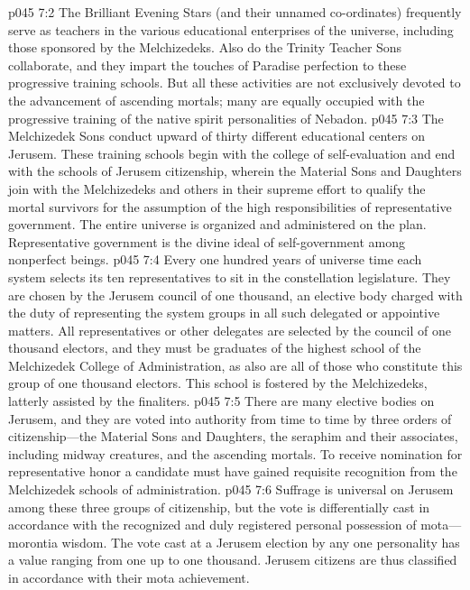 \vs p045 7:2 The Brilliant Evening Stars (and their unnamed co\hyp{}ordinates) frequently serve as teachers in the various educational enterprises of the universe, including those sponsored by the Melchizedeks. Also do the Trinity Teacher Sons collaborate, and they impart the touches of Paradise perfection to these progressive training schools. But all these activities are not exclusively devoted to the advancement of ascending mortals; many are equally occupied with the progressive training of the native spirit personalities of Nebadon.
\vs p045 7:3 The Melchizedek Sons conduct upward of thirty different educational centers on Jerusem. These training schools begin with the college of self\hyp{}evaluation and end with the schools of Jerusem citizenship, wherein the Material Sons and Daughters join with the Melchizedeks and others in their supreme effort to qualify the mortal survivors for the assumption of the high responsibilities of representative government. The entire universe is organized and administered on the  plan. Representative government is the divine ideal of self\hyp{}government among nonperfect beings.
\vs p045 7:4 Every one hundred years of universe time each system selects its ten representatives to sit in the constellation legislature. They are chosen by the Jerusem council of one thousand, an elective body charged with the duty of representing the system groups in all such delegated or appointive matters. All representatives or other delegates are selected by the council of one thousand electors, and they must be graduates of the highest school of the Melchizedek College of Administration, as also are all of those who constitute this group of one thousand electors. This school is fostered by the Melchizedeks, latterly assisted by the finaliters.
\pc \vs p045 7:5 There are many elective bodies on Jerusem, and they are voted into authority from time to time by three orders of citizenship---the Material Sons and Daughters, the seraphim and their associates, including midway creatures, and the ascending mortals. To receive nomination for representative honor a candidate must have gained requisite recognition from the Melchizedek schools of administration.
\vs p045 7:6 Suffrage is universal on Jerusem among these three groups of citizenship, but the vote is differentially cast in accordance with the recognized and duly registered personal possession of mota---morontia wisdom. The vote cast at a Jerusem election by any one personality has a value ranging from one up to one thousand. Jerusem citizens are thus classified in accordance with their mota achievement.
